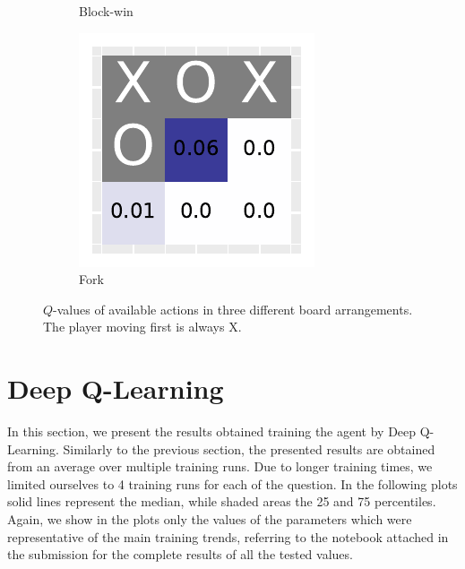 \documentclass[10pt]{IEEEtran}
\begin{document}
\begin{figure}[h]
\begin{subfigure}[t]{0.32\linewidth}
         \caption{Block-win}
         \label{fig_heatmap_2}
     \end{subfigure}
     \hfill
     \begin{subfigure}[t]{0.32\linewidth}
         \centering
         \includegraphics[width=\linewidth]{code/figures/heatmap_2.pdf}
         \caption{Fork}
         \label{fig_heatmap_3}
     \end{subfigure}
        \caption{$Q$-values of available actions in three different board arrangements. The player moving first is always X.}
        \label{plot_question_10}
\end{figure}

\section{Deep Q-Learning}
In this section, we present the results obtained training the agent by Deep Q-Learning. Similarly to the previous section, the presented results are obtained from an average over multiple training runs. Due to longer training times, we limited ourselves to 4 training runs for each of the question. In the following plots solid lines represent the median, while shaded areas the 25 and 75 percentiles. Again, we show in the plots only the values of the parameters which were representative of the main training trends, referring to the notebook attached in the submission for the complete results of all the tested values. 
\end{document}
